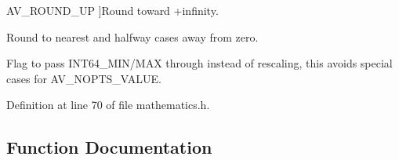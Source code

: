 \begin{Desc}
\begin{description}
{A\+V\+\_\+\+R\+O\+U\+N\+D\+\_\+\+UP\hypertarget{group__lavu__math_gga921d656eaf2c4d6800a734a13af021d0aa1d28e08e2f8b49b256e056f93038c1a}{}\label{group__lavu__math_gga921d656eaf2c4d6800a734a13af021d0aa1d28e08e2f8b49b256e056f93038c1a}
}]Round toward +infinity. \item[{\em 
A\+V\+\_\+\+R\+O\+U\+N\+D\+\_\+\+N\+E\+A\+R\+\_\+\+I\+NF\hypertarget{group__lavu__math_gga921d656eaf2c4d6800a734a13af021d0aea95b00154ff83c740b46376dfa06e11}{}\label{group__lavu__math_gga921d656eaf2c4d6800a734a13af021d0aea95b00154ff83c740b46376dfa06e11}
}]Round to nearest and halfway cases away from zero. \item[{\em 
A\+V\+\_\+\+R\+O\+U\+N\+D\+\_\+\+P\+A\+S\+S\+\_\+\+M\+I\+N\+M\+AX\hypertarget{group__lavu__math_gga921d656eaf2c4d6800a734a13af021d0a7fcb56631d6898b282d6c78ce6c14a43}{}\label{group__lavu__math_gga921d656eaf2c4d6800a734a13af021d0a7fcb56631d6898b282d6c78ce6c14a43}
}]Flag to pass I\+N\+T64\+\_\+\+M\+I\+N/\+M\+AX through instead of rescaling, this avoids special cases for A\+V\+\_\+\+N\+O\+P\+T\+S\+\_\+\+V\+A\+L\+UE. \end{description}
\end{Desc}


Definition at line 70 of file mathematics.\+h.



\subsection{Function Documentation}

